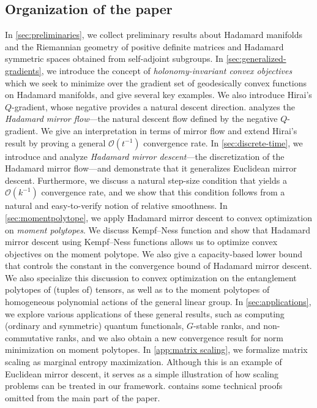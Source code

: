 \documentclass[11pt,letterpaper]{article}
\numberwithin{equation}{section}
\begin{document}
\subsection{Organization of the paper}
In \cref{sec:preliminaries}, we collect preliminary results about Hadamard manifolds and the Riemannian geometry of positive definite matrices and Hadamard symmetric spaces obtained from self-adjoint subgroups.
In \cref{sec:generalized-gradients}, we introduce the concept of \emph{holonomy-invariant convex objectives} which we seek to minimize over the gradient set of geodesically convex functions on Hadamard manifolds, and give several key examples.
We also introduce Hirai's $Q$-gradient, whose negative provides a natural descent direction.
 analyzes the \emph{Hadamard mirror flow}---the natural descent flow defined by the negative $Q$-gradient.
We give an interpretation in terms of mirror flow and extend Hirai's result by proving a general $\mathcal{O}(t^{-1})$ convergence rate.
In \cref{sec:discrete-time}, we introduce and analyze \emph{Hadamard mirror descent}---the discretization of the Hadamard mirror flow---and demonstrate that it generalizes Euclidean mirror descent.
Furthermore, we discuss a natural step-size condition that yields a $\mathcal{O}(k^{-1})$ convergence rate, and we show that this condition follows from a natural and easy-to-verify notion of relative smoothness.
In \cref{sec:momentpolytope}, we apply Hadamard mirror descent to convex optimization on \emph{moment polytopes}.
We discuss Kempf--Ness function and show that Hadamard mirror descent using Kempf--Ness functions allows us to optimize convex objectives on the moment polytope.
We also give a capacity-based lower bound that controls the constant in the convergence bound of Hadamard mirror descent.
We also specialize this discussion to convex optimization on the entanglement polytopes of (tuples of) tensors, as well as to the moment polytopes of homogeneous polynomial actions of the general linear group.
In \cref{sec:applications}, we explore various applications of these general results, such as computing (ordinary and symmetric) quantum functionals, $G$-stable ranks, and non-commutative ranks, and we also obtain a new convergence result for norm minimization on moment polytopes.
In \cref{app:matrix scaling}, we formalize matrix scaling as marginal entropy maximization.
Although this is an example of Euclidean mirror descent, it serves as a simple illustration of how scaling problems can be treated in our framework.
 contains some technical proofs omitted from the main part of the paper.
\end{document}
